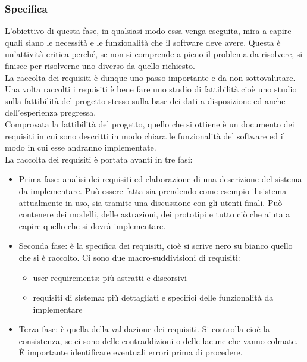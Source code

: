 \subsubsection{Specifica}
L'obiettivo di questa fase, in qualsiasi modo essa venga eseguita, mira a capire quali siano le necessità e le funzionalità che il software deve avere.
Questa è un'attività critica perché, se non si comprende a pieno il problema da risolvere, si finisce per risolverne uno diverso da quello richiesto.\\
La raccolta dei requisiti è dunque uno passo importante e da non sottovalutare.\\
Una volta raccolti i requisiti è bene fare uno studio di fattibilità cioè uno studio sulla fattibilità del progetto stesso sulla base dei dati a disposizione ed anche dell'esperienza pregressa.\\
Comprovata la fattibilità del progetto, quello che si ottiene è un documento dei requisiti in cui sono descritti in modo chiara le funzionalità del software ed il modo in cui esse andranno implementate.\\
La raccolta dei requisiti è portata avanti in tre fasi:
\begin{itemize}[noitemsep]
    \item Prima fase: analisi dei requisiti ed elaborazione di una descrizione del sistema da implementare. Può essere fatta sia prendendo come esempio il sistema attualmente in uso, sia tramite una discussione con gli utenti finali. Può contenere dei modelli, delle astrazioni, dei prototipi e tutto ciò che aiuta a capire quello che si dovrà implementare.
    \item Seconda fase: è la specifica dei requisiti, cioè si scrive nero su bianco quello che si è raccolto. Ci sono due macro-suddivisioni di requisiti:
    \begin{itemize}[noitemsep]
        \item user-requirements: più astratti e discorsivi
        \item requisiti di sistema: più dettagliati e specifici delle funzionalità da implementare
    \end{itemize}
    \item Terza fase: è quella della validazione dei requisiti. Si controlla cioè la consistenza, se ci sono delle contraddizioni o delle lacune che vanno colmate. È importante identificare eventuali errori prima di procedere.
\end{itemize}

